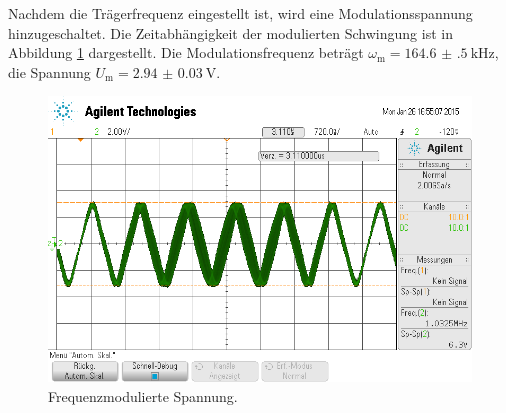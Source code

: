 Nachdem die Trägerfrequenz eingestellt ist, wird eine Modulationsspannung
hinzugeschaltet. Die Zeitabhängigkeit der modulierten Schwingung ist in
Abbildung \ref{fig:fm-zeitabh} dargestellt.
Die Modulationsfrequenz beträgt $\omega_\text{m} = \SI{164.6(5)}{\kilo\hertz}$,
die Spannung $U_\text{m} = \SI{2.94(3)}{\volt}$.
\begin{figure}
        \centering
        \includegraphics[width=0.8\linewidth]{images/fm-zeitabh.png}
        \caption{Frequenzmodulierte Spannung.}
        \label{fig:fm-zeitabh}
\end{figure}

